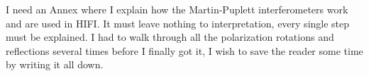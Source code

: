 I need an Annex where I explain how the Martin-Puplett interferometers work and are used in HIFI.  It must leave nothing to interpretation, every single step must be explained.  I had to walk through all the polarization rotations and reflections several times before I finally got it, I wish to save the reader some time by writing it all down.
